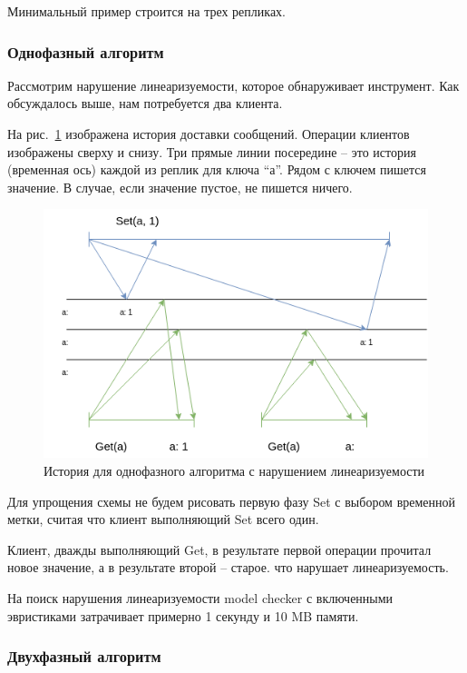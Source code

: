 Минимальный пример строится на трех репликах.

\subsubsection{Однофазный алгоритм}

Рассмотрим нарушение линеаризуемости, которое обнаруживает инструмент. Как обсуждалось выше, нам потребуется два клиента.

На рис.~\ref{fig:one_phase} изображена история доставки сообщений. Операции клиентов изображены сверху и снизу. Три прямые линии посередине – это история (временная ось) каждой из реплик для ключа “а”. Рядом с ключем пишется значение. В случае, если значение пустое, не пишется ничего.

\begin{figure}[h]
    \centering
    \includegraphics[width=\textwidth]{img/one_phase.png}
    \caption{История для однофазного алгоритма с нарушением линеаризуемости}
    \label{fig:one_phase}
\end{figure}

Для упрощения схемы не будем рисовать первую фазу Set с выбором временной метки, считая что клиент выполняющий Set всего один.

Клиент, дважды выполняющий Get, в результате первой операции прочитал новое значение, а в результате второй – старое. что нарушает линеаризуемость.

На поиск нарушения линеаризуемости model checker с включенными эвристиками затрачивает примерно 1 секунду и 10 MB памяти.

\subsubsection{Двухфазный алгоритм}

